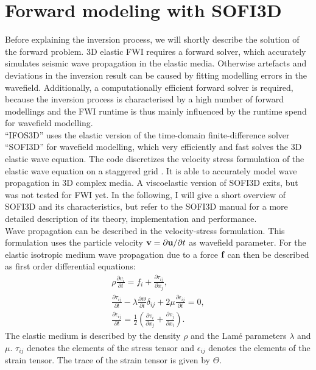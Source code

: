 \section{Forward modeling with SOFI3D}
Before explaining the inversion process, we will shortly describe the solution of the forward problem. 3D  elastic FWI requires a forward solver, which accurately simulates seismic wave propagation in the elastic media. Otherwise artefacts and deviations in the inversion result can be caused by fitting modelling errors in the wavefield. Additionally, a computationally efficient forward solver is required, because the inversion process is characterised by a high number of forward modellings and the FWI runtime is thus mainly influenced by the runtime spend for wavefield modelling. \\
``IFOS3D'' uses the elastic version of the time-domain finite-difference solver ``SOFI3D'' \citep{boh02} for wavefield modelling, which very efficiently and fast solves the 3D elastic wave equation. The code discretizes the velocity stress formulation of the elastic wave equation on a staggered grid \citep{Vir86, Lev88}. It is able to accurately model wave propagation in 3D complex media. A viscoelastic version of SOFI3D exits, but was not tested for FWI yet. In the following, I will give a short overview of SOFI3D and its characteristics, but refer to the SOFI3D manual for a more detailed description of its theory, implementation and performance.\\
Wave propagation can be described in the velocity-stress formulation. This formulation uses the particle velocity $\textbf v=\partial\textbf u/\partial t$ as wavefield parameter. For the elastic isotropic medium wave propagation due to a force $\textbf f$ can then be described as first order differential equations:
\begin{equation}
 \begin{split}
  \rho\frac{\partial v_i}{\partial t}=f_i+\frac{\partial\tau_{ij}}{\partial x_j},\\
\frac{\partial\tau_{ij}}{\partial t}-\lambda\frac{\partial\Theta}{\partial t}\delta_{ij}+2\mu\frac{\partial\epsilon_{ij}}{\partial t}=0,\\
\frac{\partial\epsilon_{ij}}{\partial t}=\frac{1}{2}\left (\frac{\partial v_i}{\partial x_j}+\frac{\partial v_j}{\partial x_i}\right ).
 \end{split}\label{equ:wave_equvel}
\end{equation}
The elastic medium is described by the density $\rho$ and the Lam\'e parameters $\lambda$ and $\mu$. $\tau_{ij}$ denotes the elements of the stress tensor and $\epsilon_{ij}$ denotes the elements of the strain tensor. The trace of the strain tensor is given by $\Theta$.
